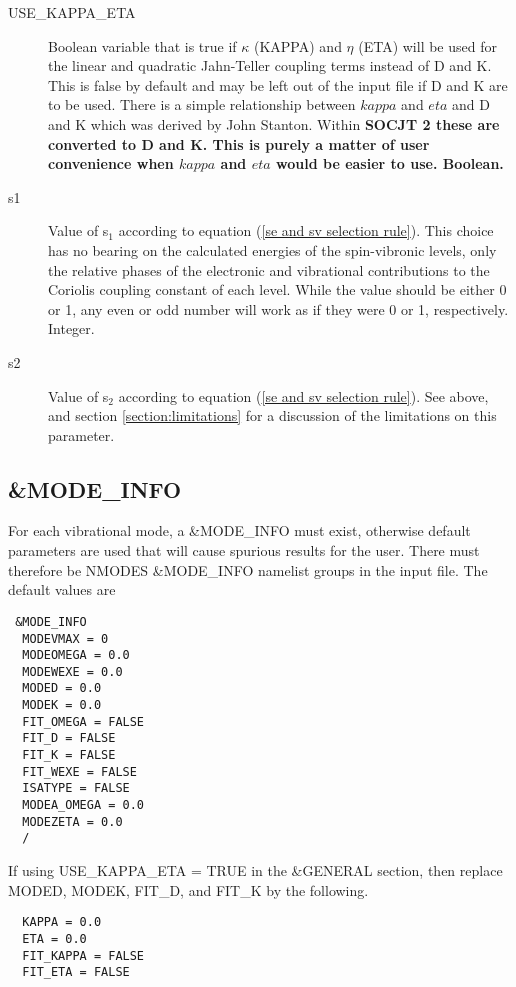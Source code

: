 \documentclass{article}
\newcommand{\socjttwo}{\bf{SOCJT 2 }}
\begin{document}
\begin{description}
  \item[USE\_KAPPA\_ETA] Boolean variable that is true if $\kappa$ (KAPPA) and 
  $\eta$ (ETA) will be used for the linear and quadratic Jahn-Teller coupling
  terms instead of D and K. This is false by default and may be left out of the
  input file if D and K are to be used. There is a simple relationship between
  $kappa$ and $eta$ and D and K which was derived by John Stanton. Within
  \socjttwo these are converted to D and K. This is purely a matter of user convenience
  when $kappa$ and $eta$ would be easier to use. Boolean.

\item[s1] Value of s$_1$ according to equation (\ref{se and sv
    selection rule}). This choice has no bearing on the calculated
  energies of the spin-vibronic levels, only the relative phases of
  the electronic and vibrational contributions to the Coriolis
  coupling constant of each level. While the value should be either 0
  or 1, any even or odd number will work as if they were 0 or 1,
  respectively. Integer. 

\item[s2] Value of s$_2$ according to equation (\ref{se and sv
    selection rule}). See above, and section \ref{section:limitations}
  for a discussion of the limitations on this parameter.

\end{description}

\subsection{\&MODE\_INFO}

For each vibrational mode, a \&MODE\_INFO must exist, otherwise
default parameters are used that will cause spurious results for the
user. There must therefore be NMODES \&MODE\_INFO namelist groups in
the input file. The default values are

\begin{verbatim}
 &MODE_INFO
  MODEVMAX = 0
  MODEOMEGA = 0.0
  MODEWEXE = 0.0
  MODED = 0.0
  MODEK = 0.0
  FIT_OMEGA = FALSE
  FIT_D = FALSE
  FIT_K = FALSE
  FIT_WEXE = FALSE
  ISATYPE = FALSE
  MODEA_OMEGA = 0.0
  MODEZETA = 0.0
  /
\end{verbatim}

If using USE\_KAPPA\_ETA = TRUE in the \&GENERAL section, then replace MODED, MODEK, FIT\_D, and FIT\_K by the following.

\begin{verbatim}
  KAPPA = 0.0
  ETA = 0.0
  FIT_KAPPA = FALSE
  FIT_ETA = FALSE
\end{verbatim}
\end{document}
